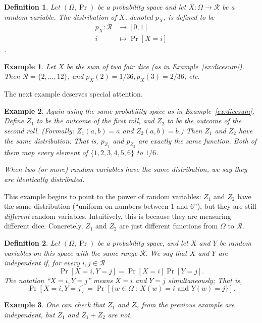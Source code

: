 \documentclass[11pt]{article}
\newtheorem{definition}{Definition}
\newtheorem{example}{Example}
\newcommand{\rvrange}{\mathcal{R}}
\begin{document}
\begin{definition}
    Let $(\Omega,\Pr)$ be a probability space and let $X:\Omega\to\rvrange$
    be a random variable. The \emph{distribution of $X$}, denoted
    $p_X$, is defined to be
    \begin{align*}
        p_X: \rvrange & \to  [0,1] \\
        i & \mapsto  \Pr[X=i]
    \end{align*}.
\end{definition}

\begin{example}
    Let $X$ be the sum of two fair dice (as in Example~\ref{ex:dicesum}).
    Then $\rvrange = \{2,\ldots,12\}$, and $p_X(2)=1/36, p_X(3)=2/36$, etc.
\end{example}

The next example deserves special attention.
\begin{example}
    Again
    using the same probability space as in Example~\ref{ex:dicesum}.
    Define $Z_1$ to be the outcome of the first roll, and $Z_2$ to be
    the outcome of the second roll. (Formally: $Z_1(a,b) = a$ and
    $Z_2(a,b)=b$.)
    Then $Z_1$ and $Z_2$ have the same distribution:
    That is, $p_{Z_1}$ and $p_{Z_2}$ are \emph{exactly the same function}.
    Both of them map every element of $\{1,2,3,4,5,6\}$ to $1/6$.

    When two (or more) random variables have the same distribution, we say
    they are \emph{identically distributed}.
\end{example}
This example begins to point to the power of random variables: $Z_1$ and $Z_2$
have the same distribution (``uniform on numbers between $1$ and $6$''),
but they are still \emph{different} random variables. 
Intuitively, this is
because they are measuring different dice. Concretely, $Z_1$ and $Z_2$ are
just different functions from $\Omega$ to $\rvrange$.

\begin{definition}
    Let $(\Omega,\Pr)$ be a probability space, and let $X$ and $Y$ be
    random variables on this space with the same range $\rvrange$. 
    We say that $X$ and $Y$ are independent
    if, for every $i,j\in\rvrange$
    \[
        \Pr[X=i,Y=j] = \Pr[X=i]\Pr[Y=j].
    \]
    The notation ``$X=i,Y=j$'' means $X=i$ and $Y=j$ simultaneously; That is,
    \[
        \Pr[X=i,Y=j] = \Pr[\{w\in\Omega \ : \ X(w)=i \text{ and } Y(w)=j\}].
    \]
\end{definition}

\begin{example}
    One can check that $Z_1$ and $Z_2$ from the previous example are
    independent, but $Z_1$ and $Z_1+Z_2$ are not.
\end{example}
\end{document}
